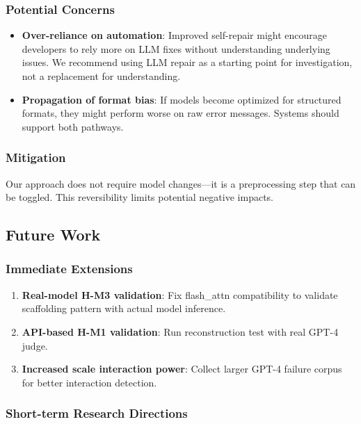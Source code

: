 \subsubsection{Potential Concerns}

\begin{itemize}
    \item \textbf{Over-reliance on automation}: Improved self-repair might encourage developers to rely more on LLM fixes without understanding underlying issues. We recommend using LLM repair as a starting point for investigation, not a replacement for understanding.
    \item \textbf{Propagation of format bias}: If models become optimized for structured formats, they might perform worse on raw error messages. Systems should support both pathways.
\end{itemize}

\subsubsection{Mitigation}

Our approach does not require model changes---it is a preprocessing step that can be toggled. This reversibility limits potential negative impacts.

\subsection{Future Work}

\subsubsection{Immediate Extensions}

\begin{enumerate}
    \item \textbf{Real-model H-M3 validation}: Fix flash\_attn compatibility to validate scaffolding pattern with actual model inference.
    \item \textbf{API-based H-M1 validation}: Run reconstruction test with real GPT-4 judge.
    \item \textbf{Increased scale interaction power}: Collect larger GPT-4 failure corpus for better interaction detection.
\end{enumerate}

\subsubsection{Short-term Research Directions}

